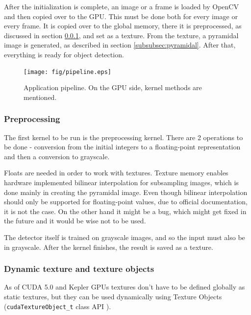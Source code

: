 After the initialization is complete, an image or a frame is loaded by OpenCV and then copied over to the GPU. This must be done both for every image or every frame. It is copied over to the global memory, there it is preprocessed, as discussed in section \ref{subsubsec:grayscale}, and set as a texture. From the texture, a pyramidal image is generated, as described in section \ref{subsubsec:pyramidal}. After that, everything is ready for object detection.

\begin{center}
\begin{figure}[h!]
	\centering\texttt{[image: fig/pipeline.eps]}
	\caption{Application pipeline. On the GPU side, kernel methods are mentioned.}
	\label{fig:pipeline}	
\end{figure}
\end{center}

\subsubsection{Preprocessing} \label{subsubsec:grayscale} 

The first kernel to be run is the preprocessing kernel. There are 2 operations to be done - conversion from the initial integers to a floating-point representation and then a conversion to grayscale.

Floats are needed in order to work with textures. Texture memory enables hardware implemented bilinear interpolation for subsampling images, which is done mainly in creating the pyramidal image. Even though bilinear interpolation should only be supported for floating-point values, due to official documentation, it is not the case. On the other hand it might be a bug, which might get fixed in the future and it would be wise not to be used.

The detector itself is trained on grayscale images, and so the input must also be in grayscale. After the kernel finishes, the result is saved as a texture.

\subsubsection{Dynamic texture and texture objects}\label{subsubsec:dynamic-texture}

As of CUDA 5.0 and Kepler GPUs textures don't have to be defined globally as static textures, but they can be used dynamically using Texture Objects (\verb|cudaTextureObject_t| class API \cite{cuda-texture-obj}).

